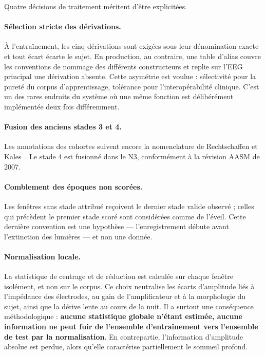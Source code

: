 Quatre décisions de traitement méritent d'être explicitées.

\paragraph{Sélection stricte des dérivations.} À l'entraînement, les cinq dérivations
sont exigées sous leur dénomination exacte et tout écart écarte le sujet. En production,
au contraire, une table d'alias couvre les conventions de nommage des différents
constructeurs et replie sur l'EEG principal une dérivation absente. Cette asymétrie est
voulue : sélectivité pour la pureté du corpus d'apprentissage, tolérance pour
l'interopérabilité clinique. C'est un des rares endroits du système où une même fonction
est délibérément implémentée deux fois différemment.

\paragraph{Fusion des anciens stades 3 et 4.} Les annotations des cohortes suivent
encore la nomenclature de Rechtschaffen et Kales~\cite{rechtschaffen1968}. Le stade 4
est fusionné dans le N3, conformément à la révision AASM de 2007.

\paragraph{Comblement des époques non scorées.} Les fenêtres sans stade attribué
reçoivent le dernier stade valide observé ; celles qui précèdent le premier stade scoré
sont considérées comme de l'éveil. Cette dernière convention est une hypothèse ---
l'enregistrement débute avant l'extinction des lumières --- et non une donnée.

\paragraph{Normalisation locale.} La statistique de centrage et de réduction est
calculée sur chaque fenêtre isolément, et non sur le corpus. Ce choix neutralise les
écarts d'amplitude liés à l'impédance des électrodes, au gain de l'amplificateur et à la
morphologie du sujet, ainsi que la dérive lente au cours de la nuit. Il a surtout une
conséquence méthodologique : \textbf{aucune statistique globale n'étant estimée, aucune
information ne peut fuir de l'ensemble d'entraînement vers l'ensemble de test par la
normalisation}. En contrepartie, l'information d'amplitude absolue est perdue, alors
qu'elle caractérise partiellement le sommeil profond.

